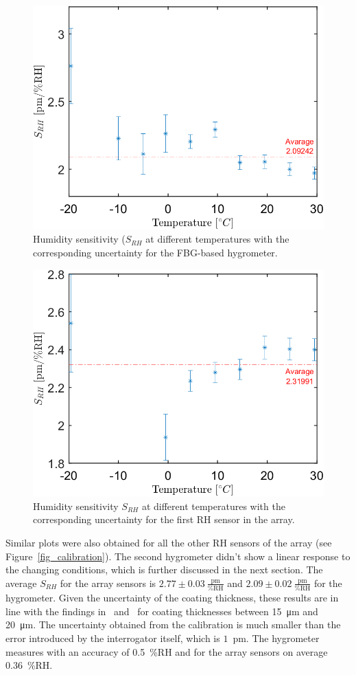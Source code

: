 \begin{figure}[!h]
\centering
\includegraphics[width=0.55\columnwidth]{Chapter5/images/RHS_RH.png}
\caption{Humidity sensitivity ($S_{RH}$ at different temperatures with the corresponding uncertainty for the FBG-based hygrometer.}
\label{fig_RH_sens}
\end{figure}
\begin{figure}[!h]
\centering
\includegraphics[width=0.55\columnwidth]{Chapter5/images/RH1_RH.png}
\caption{Humidity sensitivity $S_{RH}$ at different temperatures with the corresponding uncertainty for the first \gls{RH} sensor in the array.}
\label{fig_RH_sens2}
\end{figure}

Similar plots were also obtained for all the other \gls{RH} sensors of the array (see Figure~\ref{fig_calibration}). The second hygrometer didn't show a linear response to the changing conditions, which is further discussed in the next section.
\newpage
The average $S_{RH}$ for the array sensors is $2.77\pm 0.03~\mathrm{\frac{pm}{\%RH}}$  and $2.09\pm 0.02~\mathrm{\frac{pm}{\%RH}}$ for the hygrometer. Given the uncertainty of the coating thickness, these results are in line with the findings in~\cite{YEO_PI} and~\cite{Kronenberg:02} for coating thicknesses between \SI{15}{\micro\metre} and \SI{20}{\micro\metre}. The uncertainty obtained from the calibration is much smaller than the error introduced by the interrogator itself, which is $1$~pm. The hygrometer measures with an accuracy of 0.5~\%RH and for the array sensors on average 0.36~\%RH. 

